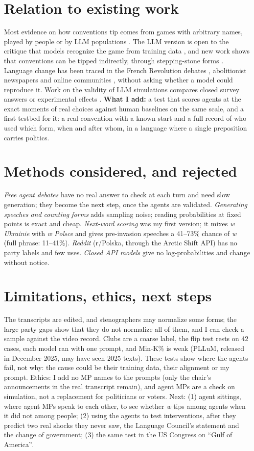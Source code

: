 \documentclass[10pt,twocolumn]{article}
\begin{document}
\section{Relation to existing work}
Most evidence on how conventions tip comes from games with arbitrary names, played by people \citep{centola2018} or by LLM populations \citep{ashery2025}. The LLM version is open to the critique that models recognize the game from training data \citep{barrie2025}, and new work shows that conventions can be tipped indirectly, through stepping-stone forms \citep{flint2026}. Language change has been traced in the French Revolution debates \citep{barron2018}, abolitionist newspapers \citep{soni2021} and online communities \citep{danescu2013}, without asking whether a model could reproduce it. Work on the validity of LLM simulations compares closed survey answers or experimental effects \citep{argyle2023,park2024,ashokkumar2026,feroz2026}. \textbf{What I add:} a test that scores agents at the exact moments of real choices against human baselines on the same scale, and a first testbed for it: a real convention with a known start and a full record of who used which form, when and after whom, in a language where a single preposition carries politics.

\section{Methods considered, and rejected}
\emph{Free agent debates} have no real answer to check at each turn and need slow generation; they become the next step, once the agents are validated. \emph{Generating speeches and counting forms} adds sampling noise; reading probabilities at fixed points is exact and cheap. \emph{Next-word scoring} was my first version; it mixes \emph{w Ukrainie} with \emph{w Polsce} and gives pre-invasion speeches a 41--73\% chance of \emph{w} (full phrase: 11--41\%). \emph{Reddit} (r/Polska, through the Arctic Shift API) has no party labels and few uses. \emph{Closed API models} give no log-probabilities and change without notice.

\section{Limitations, ethics, next steps}
The transcripts are edited, and stenographers may normalize some forms; the large party gaps show that they do not normalize all of them, and I can check a sample against the video record. Clubs are a coarse label, the flip test rests on 42 cases, each model ran with one prompt, and Min-K\% is weak (PLLuM, released in December 2025, may have seen 2025 texts). These tests show where the agents fail, not why: the cause could be their training data, their alignment or my prompt. Ethics: I add no MP names to the prompts (only the chair's announcements in the real transcript remain), and agent MPs are a check on simulation, not a replacement for politicians or voters. Next: (1) agent sittings, where agent MPs speak to each other, to see whether \emph{w} tips among agents when it did not among people; (2) using the agents to test interventions, after they predict two real shocks they never saw, the Language Council's statement and the change of government; (3) the same test in the US Congress on ``Gulf of America''.
\end{document}
